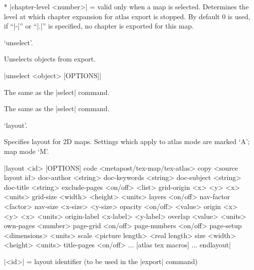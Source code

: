   * |chapter-level <number>| = valid only when a map is selected. Determines
    the level at which chapter expansion for atlas export is stopped. 
    By default 0 is used, if ``|-|'' or ``|.|'' is specified, no chapter is
    exported for this map.
\endoptions



\subsubchapter `unselect'.

\description
  Unselects objects from export.
\enddescription

\syntax
  |unselect <object> [OPTIONS]|
\endsyntax

\arguments
  The same as the |select| command.
\endarguments

\options
  The same as the |select| command. 
\endoptions


\subsubchapter `layout'.

\description
  Specifies layout for 2D maps. Settings which apply to atlas mode
  are marked `A'; map mode `M'.
\enddescription

\syntax
  |layout <id> [OPTIONS]
          code <metapost/tex-map/tex-atlas>
          copy <source layout id>
          doc-author <string>
          doc-keywords <string>
          doc-subject <string>
          doc-title <string>
          exclude-pages <on/off> <list>
          grid-origin <x> <y> <x> <units>
          grid-size <width> <height> <units>
          layers <on/off>
          nav-factor <factor>
          nav-size <x-size> <y-size>
          opacity <on/off> <value>
          origin <x> <y> <x> <units>
          origin-label <x-label> <y-label>
          overlap <value> <units>
          own-pages <number>
          page-grid <on/off>
          page-numbers <on/off>
          page-setup <dimensions> <units>
          scale <picture length> <real length>
          size <width> <height> <units>
          title-pages <on/off>
          ... [atlas tex macros] ...
        endlayout|
\endsyntax

\arguments
  |<id>| = layout identifier (to be used in the |export| command)
\endarguments

\options
\endoptions

